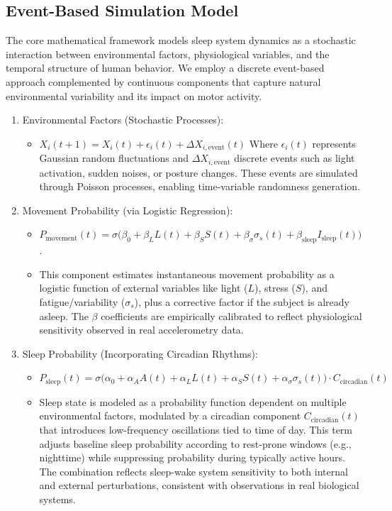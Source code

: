 \documentclass[conference]{IEEEtran}
\begin{document}
\subsection{Event-Based Simulation Model}
The core mathematical framework models sleep system dynamics as a stochastic interaction between environmental factors, physiological variables, and the temporal structure of human behavior. We employ a discrete event-based approach complemented by continuous components that capture natural environmental variability and its impact on motor activity.

\begin{enumerate}
\item Environmental Factors (Stochastic Processes):
    \begin{itemize}
    \item $X_i(t+1) = X_i(t) + \epsilon_i(t) + \Delta X_{i,\text{event}}(t)$ 
    Where \(\epsilon_i(t)\) represents Gaussian random fluctuations and \(\Delta X_{i,\text{event}}\) discrete events such as light activation, sudden noises, or posture changes. These events are simulated through Poisson processes, enabling time-variable randomness generation.
    \end{itemize}
    
\item Movement Probability (via Logistic Regression):
    \begin{itemize}
    \item \(P_{\text{movement}}(t) = \sigma\big( \beta_0 + \beta_L L(t) + \beta_S S(t) + \beta_\sigma \sigma_s(t) + \beta_{\text{sleep}} I_{\text{sleep}}(t) \big)\).
    \item This component estimates instantaneous movement probability as a logistic function of external variables like light (\(L\)), stress (\(S\)), and fatigue/variability (\(\sigma_s\)), plus a corrective factor if the subject is already asleep. The \(\beta\) coefficients are empirically calibrated to reflect physiological sensitivity observed in real accelerometry data.
    \end{itemize}
    
\item Sleep Probability (Incorporating Circadian Rhythms):
    \begin{itemize}
    \item \(P_{\text{sleep}}(t) = \sigma\big( \alpha_0 + \alpha_A A(t) + \alpha_L L(t) + \alpha_S S(t) + \alpha_\sigma \sigma_s(t) \big) \cdot C_{\text{circadian}}(t)\)
    \item Sleep state is modeled as a probability function dependent on multiple environmental factors, modulated by a circadian component \(C_{\text{circadian}}(t)\) that introduces low-frequency oscillations tied to time of day. This term adjusts baseline sleep probability according to rest-prone windows (e.g., nighttime) while suppressing probability during typically active hours. The combination reflects sleep-wake system sensitivity to both internal and external perturbations, consistent with observations in real biological systems.
    \end{itemize}
\end{enumerate}
\end{document}
